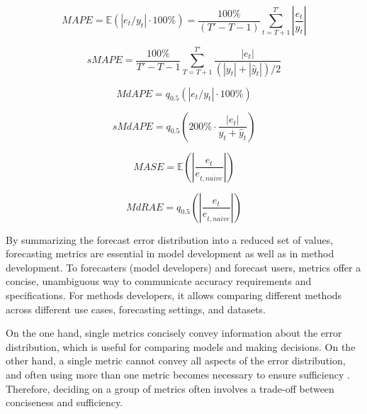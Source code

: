 \begin{equation}\label{eq:mape}
    MAPE = \mathbb{E}(|e_t/y_t|\cdot 100\%) = \frac{100\%}{(T'-T-1)}\sum_{t=T+1}^{T'} \left|\frac{e_t}{y_t}\right|
\end{equation}

\begin{equation}\label{eq:smape}
    sMAPE = \frac{100\%}{T'-T-1}\sum^{T'}_{T=T+1} \frac{|e_t|}{(|y_{t}|+|\hat{y}_{t}|)/2}
\end{equation}

\begin{equation}\label{eq:mdape}
    MdAPE = q_{0.5}(|e_t/y_t|\cdot 100\%)
\end{equation}

\begin{equation}\label{eq:smdape}
    sMdAPE = q_{0.5}\left(200\% \cdot \frac{|e_t|}{y_{t}+\hat{y}_{t}}\right)
\end{equation}

\begin{equation}\label{eq:mase}
    MASE = \mathbb{E}\left(\left|\frac{e_t}{e_{t, na\ddot{i}ve}}\right|\right)
\end{equation}

\begin{equation}\label{eq:mdrae}
    MdRAE = q_{0.5}\left(\left|\frac{e_t}{e_{t, na\ddot{i}ve}} \right|\right)
\end{equation}


By summarizing the forecast error distribution into a reduced set of values, forecasting metrics are essential in model development as well as in method development.  To forecasters (model developers) and forecast users, metrics offer  a concise, unambiguous way to communicate accuracy requirements and specifications. For methods developers, it allows comparing different methods across different use cases, forecasting settings, and datasets.

On the one hand, single metrics concisely convey information about the error distribution, which is useful for comparing models and making decisions. On the other hand, a single metric cannot convey all aspects of the error distribution, and often using more than one metric becomes necessary to ensure sufficiency \cite{armstrong2002principles}. Therefore, deciding on a group of metrics often involves a trade-off between conciseness and sufficiency.


